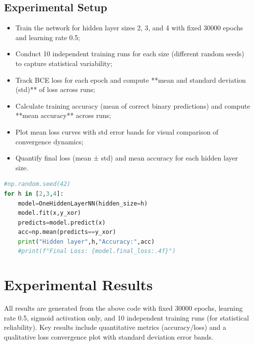 \documentclass[11pt]{article}
\begin{document}
\subsection{Experimental Setup}
\begin{itemize}
    \item Train the network for hidden layer sizes 2, 3, and 4 with fixed 30000 epochs and learning rate 0.5;
    \item Conduct 10 independent training runs for each size (different random seeds) to capture statistical variability;
    \item Track BCE loss for each epoch and compute **mean and standard deviation (std)** of loss across runs;
    \item Calculate training accuracy (mean of correct binary predictions) and compute **mean accuracy** across runs;
    \item Plot mean loss curves with std error bands for visual comparison of convergence dynamics;
    \item Quantify final loss (mean ± std) and mean accuracy for each hidden layer size.
\end{itemize}

\begin{lstlisting}[language=Python, frame=single, caption={Run more layers}]
#np.random.seed(42)
for h in [2,3,4]:
    model=OneHiddenLayerNN(hidden_size=h)
    model.fit(x,y_xor)
    predicts=model.predict(x)
    acc=np.mean(predicts==y_xor)
    print("Hidden layer",h,"Accuracy:",acc)
    #print(f"Final Loss: {model.final_loss:.4f}")
\end{lstlisting}

\section{Experimental Results}
All results are generated from the above code with fixed 30000 epochs, learning rate 0.5, sigmoid activation only, 
and 10 independent training runs (for statistical reliability). Key results include quantitative metrics (accuracy/loss) and a qualitative loss convergence plot with standard deviation error bands.
\end{document}
